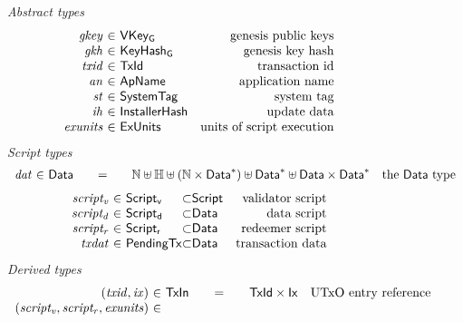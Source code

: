 \begin{figure*}[htb]
  \emph{Abstract types}
  \begin{equation*}
    \begin{array}{r@{~\in~}lr}
      \var{gkey} & \VKeyGen & \text{genesis public keys}\\
      \var{gkh} & \KeyHashGen & \text{genesis key hash}\\
      \var{txid} & \TxId & \text{transaction id}\\
      \var{an} & \ApName & \text{application name}\\
      \var{st} & \SystemTag & \text{system tag}\\
      \var{ih} & \InstallerHash & \text{update data}\\
      \var{exunits} & \ExUnits & \text{units of script execution} \\
    \end{array}
  \end{equation*}
  \emph{Script types}
  \begin{equation*}
    \begin{array}{r@{~\in~}l@{\qquad=\qquad}lr}
      \var{dat}
      & \Data
      & \mathbb{N}\uniondistinct\mathbb{H}\uniondistinct(\mathbb{N}\times\seqof{\Data})
        \uniondistinct\seqof{\Data}\uniondistinct\seqof{\Data \times \Data}
      & \text{the $\Data$ type}\\
    \end{array}
  \end{equation*}
  \begin{equation*}
    \begin{array}{r@{~\in~}l@{\subset}lr}
      \var{script_v}&\ScriptV & \Script & \text{validator script}\\
      \var{script_d}&\ScriptD & \Data & \text{data script}\\
      \var{script_r}&\ScriptR & \Data & \text{redeemer script}\\
      \var{txdat}&\PendingTx & \Data & \text{transaction data}\\
    \end{array}
  \end{equation*}
%
  \emph{Derived types}
  \begin{equation*}
    \begin{array}{r@{~\in~}l@{\qquad=\qquad}lr}
      (\var{txid}, \var{ix})
      & \type{TxIn}
      & \TxId \times \Ix
      & \text{UTxO entry reference}
      \\
      \var{(\var{script_v}, \var{script_r},\var{exunits})}

\end{array}
\end{equation*}
\end{figure*}
